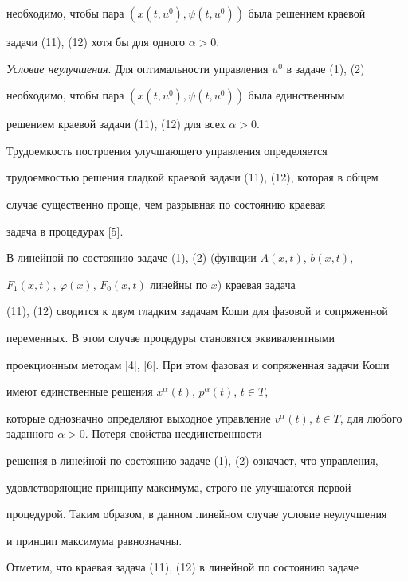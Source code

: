 необходимо, чтобы пара $(x(t,u^0),\psi(t,u^0))$ была решением краевой


задачи (11), (12) хотя бы для одного $\alpha>0$.





{\it Условие неулучшения}. Для оптимальности управления $u^0$ в задаче (1), (2)


необходимо, чтобы пара $(x(t,u^0),\psi(t,u^0))$ была единственным


решением краевой задачи (11), (12) для всех $\alpha>0$.





Трудоемкость построения улучшающего управления определяется


трудоемкостью решения гладкой краевой задачи (11), (12), которая в общем


случае существенно проще, чем разрывная по состоянию краевая


задача в процедурах [5].





В линейной по состоянию задаче (1), (2) (функции $A(x,t)$, $b(x,t)$,


$F_{1}(x,t)$, $\varphi(x)$, $F_{0}(x,t)$ линейны по $x$) краевая задача


(11), (12) сводится к двум гладким задачам Коши для фазовой и сопряженной


переменных. В этом случае процедуры становятся эквивалентными


проекционным методам [4], [6]. При этом фазовая и сопряженная задачи Коши


имеют единственные решения $x^{\alpha}(t)$, $p^{\alpha}(t)$, $t\in{T}$,


которые однозначно определяют выходное управление $v^{\alpha}(t)$, $t\in


{T}$, для любого заданного $\alpha>0$. Потеря свойства неединственности


решения в линейной по состоянию задаче (1), (2) означает, что управления,


удовлетворяющие принципу максимума, строго не улучшаются первой


процедурой. Таким образом, в данном линейном случае условие неулучшения


и принцип максимума равнозначны.





Отметим, что краевая задача (11), (12) в линейной по состоянию задаче


